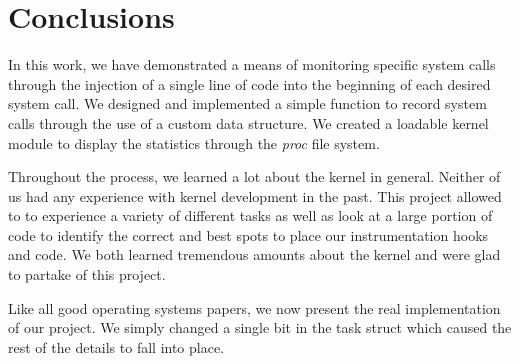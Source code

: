 \documentclass[conference]{IEEEtran}
\begin{document}
\section{Conclusions}
\label{sec:conclusions}
In this work, we have demonstrated a means of monitoring specific system calls through the injection of a single line of code into the beginning of each desired system call.
We designed and implemented a simple function to record system calls through the use of a custom data structure.
We created a loadable kernel module to display the statistics through the \textit{proc} file system.

Throughout the process, we learned a lot about the kernel in general.
Neither of us had any experience with kernel development in the past.
This project allowed to to experience a variety of different tasks as well as look at a large portion of code to identify the correct and best spots to place our instrumentation hooks and code.
We both learned tremendous amounts about the kernel and were glad to partake of this project.

Like all good operating systems papers, we now present the real implementation of our project.
We simply changed a single bit in the task struct which caused the rest of the details to fall into place.



%
%
%


\def\V{\rm vol.~}
\def\N{no.~}
\def\pp{pp.~}
\def\Pot{\it Proc. }
\def\IJCNN{\it International Joint Conference on Neural Networks\rm }
\def\ACC{\it American Control Conference\rm }
\def\SMC{\it IEEE Trans. Systems\rm , \it Man\rm , and \it Cybernetics\rm }
\end{document}
